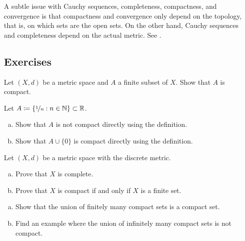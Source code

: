 \begin{remark}
A subtle issue with Cauchy sequences, completeness, compactness,
and convergence is that compactness and convergence only depend on the
topology, that is, on which sets are the open sets.  On the other hand,
Cauchy sequences and completeness depend on the actual metric.
See .
\end{remark}

\subsection{Exercises}

\begin{exercise}
Let $(X,d)$ be a metric space and $A$ a finite subset of $X$.
Show that $A$ is compact.
\end{exercise}

\begin{samepage}
\begin{exercise}
Let $A \coloneqq \{ \nicefrac{1}{n} : n \in {\mathbb{N}} \} \subset {\mathbb{R}}$.
\begin{enumerate}[a)]
\item
Show that $A$ is
not compact directly using the definition.
\item
Show that $A \cup \{ 0 \}$ is
compact directly using the definition.
\end{enumerate}
\end{exercise}
\end{samepage}


\begin{exercise}
Let $(X,d)$ be a metric space with the discrete metric.
\begin{enumerate}[a)]
\item
Prove that $X$ is complete.
\item
Prove that $X$ is compact if and only if $X$ is a finite set.
\end{enumerate}
\end{exercise}

\begin{exercise}
\leavevmode
\begin{enumerate}[a)]
\item
Show that the union of finitely many compact sets is a compact set.
\item
Find an example where the union of infinitely many compact sets is not
compact.
\end{enumerate}
\end{exercise}

